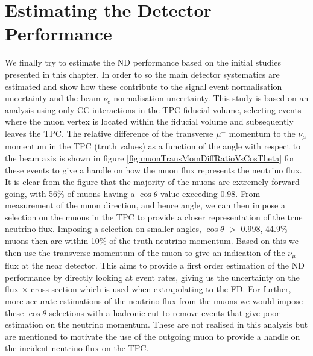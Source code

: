 \section{Estimating the Detector Performance}
We finally try to estimate the ND performance based on the initial studies presented in this chapter. In order to so the main detector systematics are estimated and show how these contribute to the signal event normalisation uncertainty and the beam $\nu_{e}$ normalisation uncertainty. This study is based on an analysis using only CC interactions in the TPC fiducial volume, selecting events where the muon vertex is located within the fiducial volume and subsequently leaves the TPC. The relative difference of the transverse $\mu^{-}$ momentum to the $\nu_{\mu}$ momentum in the TPC (truth values) as a function of the angle with respect to the beam axis is shown in figure \ref{fig:muonTransMomDiffRatioVsCosTheta} for these events to give a handle on how the muon flux represents the neutrino flux. It is clear from the figure that the majority of the muons are extremely forward going, with 56\% of muons having a $\cos{\theta}$ value exceeding 0.98. From measurement of the muon direction, and hence angle, we can then impose a selection on the muons in the TPC to provide a closer representation of the true neutrino flux. Imposing a selection on smaller angles, $\cos{\theta}$ $>$ 0.998, 44.9\% muons then are within 10\% of the truth neutrino momentum. Based on this we then use the transverse momentum of the muon to give an indication of the $\nu_{\mu}$ flux at the near detector. This aims to provide a first order estimation of the ND performance by directly looking at event rates, giving us the uncertainty on the flux $\times$ cross section which is used when extrapolating to the FD. For further, more accurate estimations of the neutrino flux from the muons we would impose these $\cos{\theta}$ selections with a hadronic cut to remove events that give poor estimation on the neutrino momentum. These are not realised in this analysis but are mentioned to motivate the use of the outgoing muon to provide a handle on the incident neutrino flux on the TPC.


